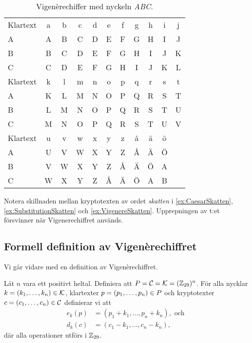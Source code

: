 \begin{table*}
  \caption{%
    Vigenèrechiffer med nyckeln \emph{ABC}.
  }\label{tbl:Vigenerechiffer}
  \centering
  \begin{tabular}{lcccccccccc}
    \toprule
    Klartext & a & b & c & d & e & f & g & h & i & j \\
    A        & A & B & C & D & E & F & G & H & I & J \\
    B        & B & C & D & E & F & G & H & I & J & K \\
    C        & C & D & E & F & G & H & I & J & K & L \\
    \midrule
    Klartext & k & l & m & n & o & p & q & r & s & t \\
    A        & K & L & M & N & O & P & Q & R & S & T \\
    B        & L & M & N & O & P & Q & R & S & T & U \\
    C        & M & N & O & P & Q & R & S & T & U & V \\
    \midrule
    Klartext & u & v & w & x & y & z & å & ä & ö \\
    A        & U & V & W & X & Y & Z & Å & Ä & Ö \\
    B        & V & W & X & Y & Z & Å & Ä & Ö & A \\
    C        & W & X & Y & Z & Å & Ä & Ö & A & B \\
    \bottomrule
  \end{tabular}
\end{table*}

Notera skillnaden mellan kryptotexten av ordet \emph{skatten} i 
\cref{ex:CaesarSkatten}, \cref{ex:SubstitutionSkatten} och 
\cref{ex:VigenereSkatten}.
Upprepningen av t:et försvinner när Vigenerechiffret används.

\subsection{Formell definition av Vigenèrechiffret}
Vi går vidare med en definition av Vigenèrechiffret.
\begin{definition}[Vigenèrechiffer]
  Låt \(n\) vara ett positivt heltal.
  Definiera att \(\P = \C = \K = (\Z_{29})^n\).
  För alla nycklar \(k = (k_1,\ldots,k_n)\in \operatorname{\mathcal{K}}\), klartexter \(p = (p_1, 
  \ldots, p_n)\in \P\) och kryptotexter \(c = (c_1,\ldots,c_n)\in \operatorname{\mathcal{C}}\) 
  definierar vi att
  \begin{align}
    \nonumber
    e_k(p) &= (p_1 + k_1, \ldots, p_n + k_n), \text{\ och\ } \\
    \nonumber
    d_k(c) &= (c_1 - k_1, \ldots, c_n - k_n),
  \end{align}
  där alla operationer utförs i \(\mathbb{Z}_{29}\).
\end{definition}

